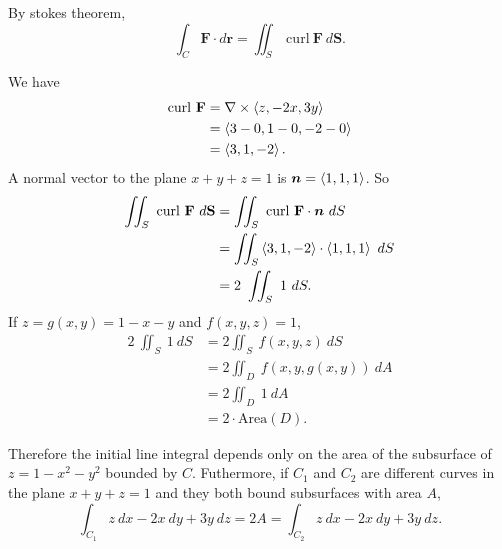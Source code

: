 \documentclass[12pt]{exam}
\newcommand{\mbf}{\mathbf{F}}
\begin{document}
\begin{questions}
\begin{solution}
        By stokes theorem,
        \[
            \int_C \mbf \cdot d\bm{r} = \iint_S~\mathrm{curl}~\mbf~d\mathbf{S}.
        \]

        We have 
        \begin{align*}
            \mathrm{curl}~\mbf & = \nabla \times \gen{z,-2x,3y}\\
                & = \gen{3-0,1-0,-2-0}\\
                & = \gen{3,1,-2}.
        \end{align*}
        A normal vector to the plane \(x+y+z=1\) is \(\bm{n}=\left\langle 1,1,1 \right\rangle\). So
        \begin{align*}
            \iint_S~\mathrm{curl}~\mbf~d\mathbf{S} 
                & = \iint_S~\mathrm{curl}~\mbf \cdot \bm{n}~dS\\
                & = \iint_S\gen{3,1,-2}\cdot\gen{1,1,1}~dS\\
                & = 2~\iint_S~1~dS.
        \end{align*}
        If \(z=g(x,y)=1-x-y\) and \(f(x,y,z)=1\),
        \begin{align*}
            2~\iint_S~1~dS &= 2\iint_S~f(x,y,z)~dS\\
                & = 2\iint_D~f(x,y,g(x,y))~dA\\
                & = 2\iint_D~1~dA\\
                & = 2\cdot\text{Area}(D).
        \end{align*}

        Therefore the initial line integral depends only on the area of the subsurface of \(z=1-x^2-y^2\) bounded by \(C\). Futhermore, if \(C_1\) and \(C_2\) are different curves in the plane \(x+y+z=1\) and they both bound subsurfaces with area \(A\),
            \[
                \int_{C_1} z~dx-2x~dy+3y~dz = 2A = \int_{C_2} z~dx-2x~dy+3y~dz.
            \]
        \end{solution}
    \else
        \vfill
    \fi

\end{questions}
\end{document}
